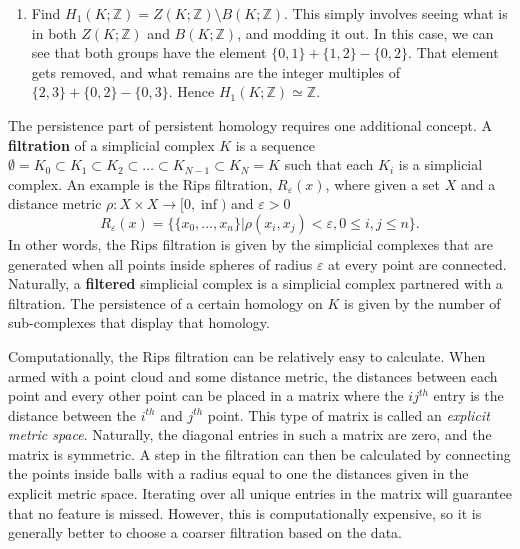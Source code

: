 \documentclass[a4paper,12pt]{report}
\begin{document}
\begin{enumerate}
\[ 
\partial_2(K)\rightarrow \left(
\begin{array}{l|c}
 & \{0,1,2\}\\
 \hline
\{0,1\} + \{1,2\} - \{0,2\}& 1\\
\{0,2\} + \{0,1\} & 0\\
\{1,2\} - \{0,1\} & 0
 \end{array}\right)
\]

Hence, $B(K;\mathbb{Z}) = Im(\partial_2(K)) = \left[\{0,1\} + \{1,2\} - \{0,2\}\right]$ and $Z(K;\mathbb{Z}) = Ker(\partial_1(K)) = \left[\{0,1\} + \{1,2\} - \{0,2\},\,\{2,3\} + \{0,2\} - \{0,3\}\right]$, where the square brackets denote that any integer multiple of these 1-chains will be in their respective set as well.
\item Find $H_1(K;\mathbb{Z}) = Z(K;\mathbb{Z})\setminus B(K;\mathbb{Z})$. This simply involves seeing what is in both $Z(K;\mathbb{Z})$ and $B(K;\mathbb{Z})$, and modding it out. In this case, we can see that both groups have the element $\{0,1\} + \{1,2\} - \{0,2\}$. That element gets removed, and what remains are the integer multiples of $\{2,3\} + \{0,2\} - \{0,3\}$. Hence $H_1(K;\mathbb{Z}) \simeq \mathbb{Z}$.
  \end{enumerate}

The persistence part of persistent homology requires one additional concept. A \textbf{filtration} of a simplicial complex $K$ is a sequence $\emptyset = K_0\subset K_1\subset K_2\subset \ldots\subset K_{N-1}\subset K_N = K$ such that each $K_i$ is a simplicial complex. An example is the Rips filtration, $R_\varepsilon(x)$, where given a set $X$ and a distance metric $\rho: X\times X\rightarrow [0,\inf)$ and $\varepsilon > 0$
\[
 R_\varepsilon(x) = \{\{x_0,\ldots,x_n\}|\rho(x_i,x_j)<\varepsilon, 0\leq i,j \leq n\}.
\]
In other words, the Rips filtration is given by the simplicial complexes that are generated when all points inside spheres of radius $\varepsilon$ at every point are connected. Naturally, a \textbf{filtered} simplicial complex is a simplicial complex partnered with a filtration. The persistence of a certain homology on $K$ is given by the number of sub-complexes that display that homology. 

Computationally, the Rips filtration can be relatively easy to calculate. When armed with a point cloud and some distance metric, the distances between each point and every other point can be placed in a matrix where the $ij^{th}$ entry is the distance between the $i^{th}$ and $j^{th}$ point. This type of matrix is called an \textit{explicit metric space}. Naturally, the diagonal entries in such a matrix are zero, and the matrix is symmetric. A step in the filtration can then be calculated by connecting the points inside balls with a radius equal to one the distances given in the explicit metric space. Iterating over all unique entries in the matrix will guarantee that no feature is missed. However, this is computationally expensive, so it is generally better to choose a coarser filtration based on the data.
\end{document}
